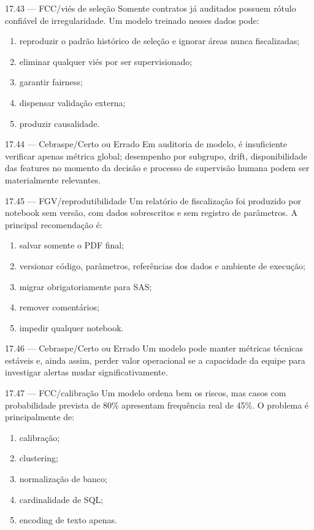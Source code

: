 \begin{questao}{ 17.43 — FCC/viés de seleção}
Somente contratos já auditados possuem rótulo confiável de irregularidade. Um modelo treinado nesses dados pode:
\begin{enumerate}[label=\Alph*)]
\item reproduzir o padrão histórico de seleção e ignorar áreas nunca fiscalizadas;
\item eliminar qualquer viés por ser supervisionado;
\item garantir fairness;
\item dispensar validação externa;
\item produzir causalidade.
\end{enumerate}
\end{questao}

\begin{questao}{ 17.44 — Cebraspe/Certo ou Errado}
Em auditoria de modelo, é insuficiente verificar apenas métrica global; desempenho por subgrupo, drift, disponibilidade das features no momento da decisão e processo de supervisão humana podem ser materialmente relevantes.
\end{questao}

\begin{questao}{ 17.45 — FGV/reprodutibilidade}
Um relatório de fiscalização foi produzido por notebook sem versão, com dados sobrescritos e sem registro de parâmetros. A principal recomendação é:
\begin{enumerate}[label=\Alph*)]
\item salvar somente o PDF final;
\item versionar código, parâmetros, referências dos dados e ambiente de execução;
\item migrar obrigatoriamente para SAS;
\item remover comentários;
\item impedir qualquer notebook.
\end{enumerate}
\end{questao}

\begin{questao}{ 17.46 — Cebraspe/Certo ou Errado}
Um modelo pode manter métricas técnicas estáveis e, ainda assim, perder valor operacional se a capacidade da equipe para investigar alertas mudar significativamente.
\end{questao}

\begin{questao}{ 17.47 — FCC/calibração}
Um modelo ordena bem os riscos, mas casos com probabilidade prevista de 80\% apresentam frequência real de 45\%. O problema é principalmente de:
\begin{enumerate}[label=\Alph*)]
\item calibração;
\item clustering;
\item normalização de banco;
\item cardinalidade de SQL;
\item encoding de texto apenas.
\end{enumerate}
\end{questao}

